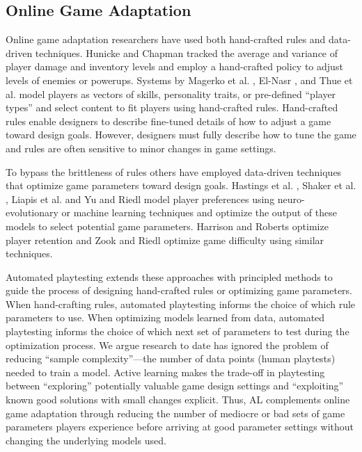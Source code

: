 \documentclass{sig-alternate}
\begin{document}
\subsection{Online Game Adaptation}
Online game adaptation researchers have used both hand-crafted rules and data-driven techniques.
Hunicke and Chapman \cite{hunicke2004:dda} tracked the average and variance of player damage and inventory levels and employ a hand-crafted policy to adjust levels of enemies or powerups. 
Systems by Magerko et al. \cite{magerko2006:isat}, El-Nasr \cite{seifel-nasr2007:mirage}, and Thue et al. \cite{thue2007:storytell-pm} model players as vectors of skills, personality traits, or pre-defined ``player types'' and select content to fit players using hand-crafted rules. %
Hand-crafted rules enable designers to describe fine-tuned details of how to adjust a game toward design goals.
However, designers must fully describe how to tune the game and rules are often sensitive to minor changes in game settings.

To bypass the brittleness of rules others have employed data-driven techniques that optimize game parameters toward design goals.
Hastings et al. \cite{hastings2009:gar}, Shaker et al. \cite{shaker2013:crowdsource-platform-aesthetics}, Liapis et al. \cite{liapis2013:rank-based-interactive-evol} and Yu and Riedl \cite{yu2013:storyeti} model player preferences using neuro-evolutionary or machine learning techniques and optimize the output of these models to select potential game parameters.
Harrison and Roberts \cite{harrison2013:scrabble-retention} optimize player retention and Zook and Riedl \cite{zook2012:tf} optimize game difficulty using similar techniques.

Automated playtesting extends these approaches with principled methods to guide the process of designing hand-crafted rules or optimizing game parameters.
When hand-crafting rules, automated playtesting informs the choice of which rule parameters to use.
When optimizing models learned from data, automated playtesting informs the choice of which next set of parameters to test during the optimization process.
We argue research to date has ignored the problem of reducing ``sample complexity''---the number of data points (human playtests) needed to train a model.
Active learning makes the trade-off in playtesting between ``exploring'' potentially valuable game design settings and ``exploiting'' known good solutions with small changes explicit.
Thus, AL complements online game adaptation through reducing the number of mediocre or bad sets of game parameters players experience before arriving at good parameter settings without changing the underlying models used.
\end{document}
